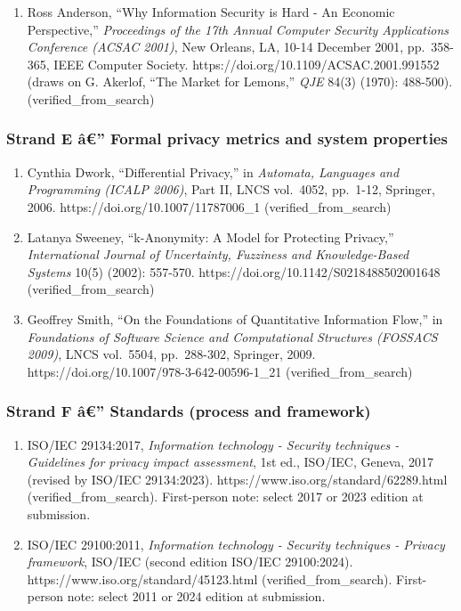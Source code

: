 \documentclass[
  11pt,
]{article}
\providecommand{\tightlist}{%
  \setlength{\itemsep}{0pt}\setlength{\parskip}{0pt}}
\begin{document}
\begin{enumerate}
\def\labelenumi{\arabic{enumi}.}
\setcounter{enumi}{14}
\tightlist
\item
  Ross Anderson, ``Why Information Security is Hard - An Economic
  Perspective,'' \emph{Proceedings of the 17th Annual Computer Security
  Applications Conference (ACSAC 2001)}, New Orleans, LA, 10-14 December
  2001, pp.~358-365, IEEE Computer Society.
  https://doi.org/10.1109/ACSAC.2001.991552 (draws on G. Akerlof, ``The
  Market for Lemons,'' \emph{QJE} 84(3) (1970): 488-500).
  (verified\_from\_search)
\end{enumerate}

\subsubsection{Strand E â€'' Formal privacy metrics and system
properties}\label{strand-e-uxe2-formal-privacy-metrics-and-system-properties}

\begin{enumerate}
\def\labelenumi{\arabic{enumi}.}
\setcounter{enumi}{15}
\tightlist
\item
  Cynthia Dwork, ``Differential Privacy,'' in \emph{Automata, Languages
  and Programming (ICALP 2006)}, Part II, LNCS vol.~4052, pp.~1-12,
  Springer, 2006. https://doi.org/10.1007/11787006\_1
  (verified\_from\_search)
\item
  Latanya Sweeney, ``k-Anonymity: A Model for Protecting Privacy,''
  \emph{International Journal of Uncertainty, Fuzziness and
  Knowledge-Based Systems} 10(5) (2002): 557-570.
  https://doi.org/10.1142/S0218488502001648 (verified\_from\_search)
\item
  Geoffrey Smith, ``On the Foundations of Quantitative Information
  Flow,'' in \emph{Foundations of Software Science and Computational
  Structures (FOSSACS 2009)}, LNCS vol.~5504, pp.~288-302, Springer,
  2009. https://doi.org/10.1007/978-3-642-00596-1\_21
  (verified\_from\_search)
\end{enumerate}

\subsubsection{Strand F â€'' Standards (process and
framework)}\label{strand-f-uxe2-standards-process-and-framework}

\begin{enumerate}
\def\labelenumi{\arabic{enumi}.}
\setcounter{enumi}{18}
\tightlist
\item
  ISO/IEC 29134:2017, \emph{Information technology - Security techniques
  - Guidelines for privacy impact assessment}, 1st ed., ISO/IEC, Geneva,
  2017 (revised by ISO/IEC 29134:2023).
  https://www.iso.org/standard/62289.html (verified\_from\_search).
  First-person note: select 2017 or 2023 edition at submission.
\item
  ISO/IEC 29100:2011, \emph{Information technology - Security techniques
  - Privacy framework}, ISO/IEC (second edition ISO/IEC 29100:2024).
  https://www.iso.org/standard/45123.html (verified\_from\_search).
  First-person note: select 2011 or 2024 edition at submission.
\end{enumerate}
\end{document}
